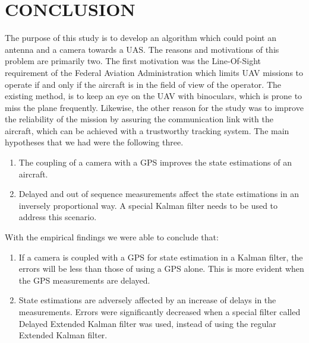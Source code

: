 \chapter{CONCLUSION}
\label{ch:conclusion}




The purpose of this study is to develop an algorithm which could point an antenna and a camera towards a UAS. The reasons and motivations of this problem are primarily two. The first motivation was the Line-Of-Sight requirement of the Federal Aviation Administration which limits UAV missions to operate if and only if the aircraft is in the field of view of the operator. The existing method, is to keep an eye on the UAV with binoculars, which is prone to miss the plane frequently. Likewise, the other reason for the study was to improve the reliability of the mission by assuring the communication link with the aircraft, which can be achieved with a trustworthy tracking system. \linebreak
\linebreak
The main hypotheses that we had were the following three.
\begin{enumerate}
\item The coupling of a camera with a GPS improves the state estimations of an aircraft.
\item Delayed and out of sequence measurements affect the state estimations in an inversely proportional way. A special Kalman filter needs to be used to address this scenario.
\end{enumerate}
With the empirical findings we were able to conclude that:
\begin{enumerate}
\item If a camera is coupled with a GPS for state estimation in a Kalman filter, the errors will be less than those of using a GPS alone. This is more evident when the GPS measurements are delayed.
\item State estimations are adversely affected by an increase of delays in the measurements. Errors were significantly decreased when a special filter called Delayed Extended Kalman filter was used, instead of using the regular Extended Kalman filter.
\end{enumerate}
\pagebreak

